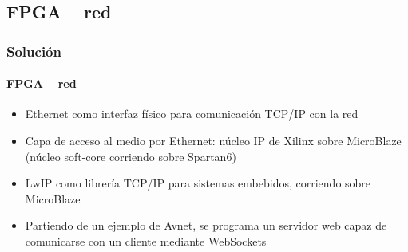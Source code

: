 \documentclass[compress]{beamer}
\begin{document}
	\subsection{FPGA -- red}
		\begin{frame}
			\frametitle{Soluci\'on}
			\framesubtitle{FPGA -- red}
				\begin{itemize}
					\item
					{

						Ethernet como interfaz f\'isico para comunicaci\'on TCP/IP con la red

					}
					\item
					{

						Capa de acceso al medio por Ethernet: n\'ucleo IP de Xilinx sobre MicroBlaze (n\'ucleo soft-core corriendo sobre Spartan6)

					}
					\item
					{

						LwIP como librer\'ia TCP/IP para sistemas embebidos, corriendo sobre MicroBlaze

					}
					\item
					{

						Partiendo de un ejemplo de Avnet, se programa un servidor web capaz de comunicarse con un cliente mediante WebSockets

					}
				\end{itemize}

 		\end{frame}
\end{document}
